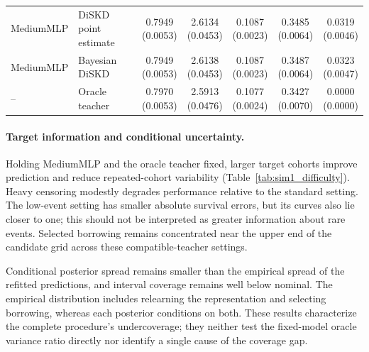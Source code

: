 \documentclass{article} %
\begin{document}
\begin{table}[!htbp]
\begin{tabular}{llccccc}
MediumMLP & DiSKD point estimate & \shortstack{0.7949\\(0.0053)} & \shortstack{2.6134\\(0.0453)} & \shortstack{0.1087\\(0.0023)} & \shortstack{0.3485\\(0.0064)} & \shortstack{0.0319\\(0.0046)} \\
MediumMLP & Bayesian DiSKD & \shortstack{0.7949\\(0.0053)} & \shortstack{2.6138\\(0.0453)} & \shortstack{0.1087\\(0.0023)} & \shortstack{0.3487\\(0.0064)} & \shortstack{0.0323\\(0.0047)} \\
\midrule
-- & Oracle teacher & \shortstack{0.7970\\(0.0053)} & \shortstack{2.5913\\(0.0476)} & \shortstack{0.1077\\(0.0024)} & \shortstack{0.3427\\(0.0070)} & \shortstack{0.0000\\(0.0000)} \\
\bottomrule
\end{tabular}
\end{table}

\paragraph{Target information and conditional uncertainty.}
\label{sec:sim1_difficulty}
Holding MediumMLP and the oracle teacher fixed, larger target cohorts improve prediction and reduce repeated-cohort variability (Table~\ref{tab:sim1_difficulty}). Heavy censoring modestly degrades performance relative to the standard setting. The low-event setting has smaller absolute survival errors, but its curves also lie closer to one; this should not be interpreted as greater information about rare events. Selected borrowing remains concentrated near the upper end of the candidate grid across these compatible-teacher settings.



Conditional posterior spread remains smaller than the empirical spread of the refitted predictions, and interval coverage remains well below nominal. The empirical distribution includes relearning the representation and selecting borrowing, whereas each posterior conditions on both. These results characterize the complete procedure's undercoverage; they neither test the fixed-model oracle variance ratio directly nor identify a single cause of the coverage gap.
\end{document}
